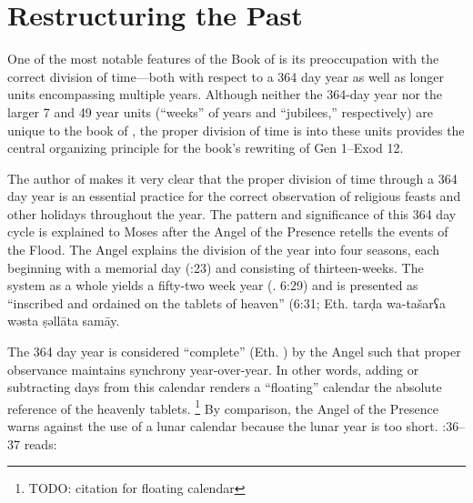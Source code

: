 
\section{Restructuring the Past}

One of the most notable features of the Book of \jub is its preoccupation with the correct division of time---both with respect to a 364 day year as well as longer units encompassing multiple years. Although neither the 364-day year nor the larger 7 and 49 year units (``weeks'' of years and ``jubilees,'' respectively) are unique to the book of \jub, the proper division of time is into these units provides the central organizing principle for the book's rewriting of Gen 1--Exod 12.

The author of \jub makes it very clear that the proper division of time through a 364 day year is an essential practice for the correct observation of religious feasts and other holidays throughout the year. The pattern and significance of this 364 day cycle is explained to Moses after the Angel of the Presence retells the events of the Flood. The Angel explains the division of the year into four seasons, each beginning with a memorial day (:23) and consisting of thirteen-weeks. The system as a whole yields a fifty-two week year (\jub. 6:29) and is presented as ``inscribed and ordained on the tablets of heaven'' (6:31; Eth.
        {tarḍa wa-tašarʕa wəsta ṣəllāta samāy}.

The 364 day year is considered ``complete'' (Eth. ) by the Angel such that proper observance maintains synchrony year-over-year. In other words, adding or subtracting days from this calendar renders a ``floating'' calendar \visavis the absolute reference of the heavenly tablets.%
    \footnote{TODO: citation for floating calendar}
By comparison, the Angel of the Presence warns against the use of a lunar calendar because the lunar year is too short. :36--37 reads:

